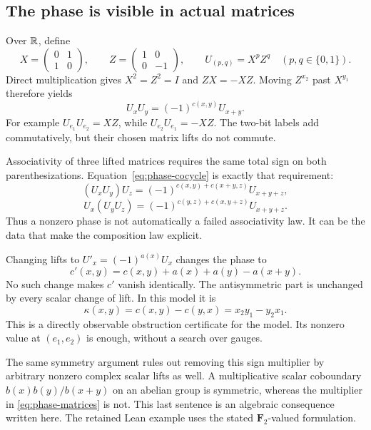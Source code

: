 
\subsection{The phase is visible in actual matrices}
Over \(\mathbb R\), define
\[
 X=\begin{pmatrix}0&1\\1&0\end{pmatrix},\qquad
 Z=\begin{pmatrix}1&0\\0&-1\end{pmatrix},\qquad
 U_{(p,q)}=X^pZ^q\quad(p,q\in\{0,1\}).
\]
Direct multiplication gives \(X^2=Z^2=I\) and \(ZX=-XZ\). Moving \(Z^{x_2}\) past \(X^{y_1}\) therefore yields
\begin{equation}\label{eq:phase-matrices}
 U_xU_y=(-1)^{c(x,y)}U_{x+y}.
\end{equation}
For example \(U_{e_1}U_{e_2}=XZ\), while \(U_{e_2}U_{e_1}=-XZ\). The two-bit labels add commutatively, but their chosen matrix lifts do not commute.

Associativity of three lifted matrices requires the same total sign on both parenthesizations. Equation~\eqref{eq:phase-cocycle} is exactly that requirement:
\[
 (U_xU_y)U_z
 =(-1)^{c(x,y)+c(x+y,z)}U_{x+y+z},
\]
\[
 U_x(U_yU_z)
 =(-1)^{c(y,z)+c(x,y+z)}U_{x+y+z}.
\]
Thus a nonzero phase is not automatically a failed associativity law. It can be the data that make the composition law explicit.

Changing lifts to \(U'_x=(-1)^{a(x)}U_x\) changes the phase to
\[
 c'(x,y)=c(x,y)+a(x)+a(y)-a(x+y).
\]
No such change makes \(c'\) vanish identically. The antisymmetric part is unchanged by every scalar change of lift. In this model it is
\[
 \kappa(x,y)=c(x,y)-c(y,x)
            =x_2y_1-y_2x_1.
\]
This is a directly observable obstruction certificate for the model. Its nonzero value at \((e_1,e_2)\) is enough, without a search over gauges.

The same symmetry argument rules out removing this sign multiplier by arbitrary nonzero complex scalar lifts as well. A multiplicative scalar coboundary \(b(x)b(y)/b(x+y)\) on an abelian group is symmetric, whereas the multiplier in \eqref{eq:phase-matrices} is not. This last sentence is an algebraic consequence written here. The retained Lean example uses the stated \(\mathbf F_2\)-valued formulation.

